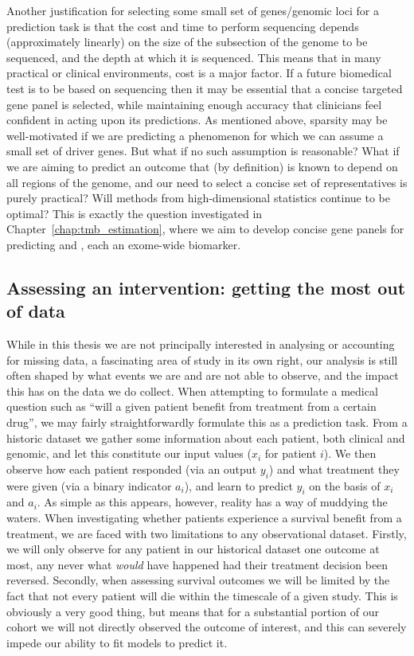 \documentclass[thesis.tex]{subfiles}
\begin{document}
Another justification for selecting some small set of genes/genomic loci for a prediction task is that the cost and time to perform sequencing depends (approximately linearly) on the size of the subsection of the genome to be sequenced, and the depth at which it is sequenced. This means that in many practical or clinical environments, cost is a major factor. If a future biomedical test is to be based on sequencing then it may be essential that a concise targeted gene panel is selected, while maintaining enough accuracy that clinicians feel confident in acting upon its predictions. As mentioned above, sparsity may be well-motivated if we are predicting a phenomenon for which we can assume a small set of driver genes. But what if no such assumption is reasonable? What if we are aiming to predict an outcome that (by definition) is known to depend on all regions of the genome, and our need to select a concise set of representatives is purely practical? Will methods from high-dimensional statistics continue to be optimal? This is exactly the question investigated in Chapter~\ref{chap:tmb_estimation}, where we aim to develop concise gene panels for predicting  and , each an exome-wide biomarker.


\subsection{Assessing an intervention: getting the most out of data}
While in this thesis we are not principally interested in analysing or accounting for missing data, a fascinating area of study in its own right, our analysis is still often shaped by what events we are and are not able to observe, and the impact this has on the data we do collect. When attempting to formulate a medical question such as ``will a given patient benefit from treatment from a certain drug'', we may fairly straightforwardly formulate this as a prediction task. From a historic dataset we gather some information about each patient, both clinical and genomic, and let this constitute our input values ($x_i$ for patient $i$). We then observe how each patient responded (via an output $y_i$) and what treatment they were given (via a binary indicator $a_i$), and learn to predict $y_i$ on the basis of $x_i$ and $a_i$. As simple as this appears, however, reality has a way of muddying the waters. When investigating whether patients experience a survival benefit from a treatment, we are faced with two limitations to any observational dataset. Firstly, we will only observe for any patient in our historical dataset one outcome at most, any never what \emph{would} have happened had their treatment decision been reversed. Secondly, when assessing survival outcomes we will be limited by the fact that not every patient will die within the timescale of a given study. This is obviously a very good thing, but means that for a substantial portion of our cohort we will not directly observed the outcome of interest, and this can severely impede our ability to fit models to predict it.
\end{document}
